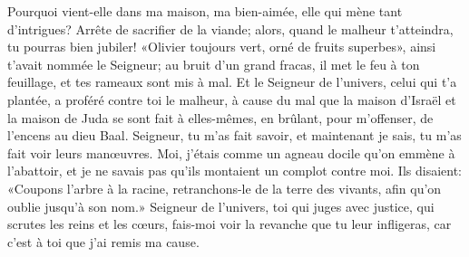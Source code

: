 Pourquoi vient-elle dans ma maison, ma bien-aimée,
	elle qui mène tant d’intrigues?
Arrête de sacrifier de la viande;
	alors, quand le malheur t’atteindra, tu pourras bien jubiler!
«Olivier toujours vert, orné de fruits superbes»,
	ainsi t’avait nommée le Seigneur;
	au bruit d’un grand fracas, il met le feu à ton feuillage,
	et tes rameaux sont mis à mal.
Et le Seigneur de l’univers, celui qui t’a plantée,
	a proféré contre toi le malheur,
	à cause du mal que la maison d’Israël et la maison de Juda
		se sont fait à elles-mêmes,
	en brûlant, pour m’offenser, de l’encens au dieu Baal.
Seigneur, tu m’as fait savoir, et maintenant je sais,
	tu m’as fait voir leurs manœuvres.
Moi, j’étais comme un agneau docile qu’on emmène à l’abattoir,
	et je ne savais pas qu’ils montaient un complot contre moi.
Ils disaient: «Coupons l’arbre à la racine,
	retranchons-le de la terre des vivants, afin qu’on oublie jusqu’à son nom.»
Seigneur de l’univers, toi qui juges avec justice,
	qui scrutes les reins et les cœurs,
	fais-moi voir la revanche que tu leur infligeras,
	car c’est à toi que j’ai remis ma cause.
